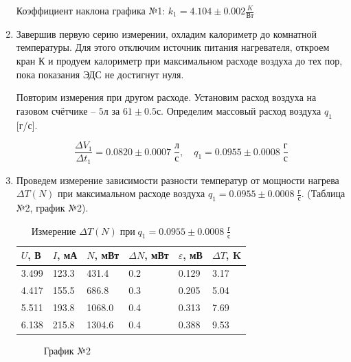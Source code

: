 \documentclass[a4paper,12pt]{article}
\begin{document}
\begin{enumerate}
		Коэффициент наклона графика №1: $k_1 = 4.104\pm0.002 \frac{K}{Вт}$
			
		\item Завершив первую серию измерении, охладим калориметр до комнатной температуры.
		Для этого отключим источник питания нагревателя, откроем кран К и продуем калориметр при максимальном расходе воздуха до тех пор, пока показания ЭДС не достигнут нуля.
		
		Повторим измерения при другом расходе. Установим расход воздуха на газовом счётчике -- $5$л за $61 \pm 0.5$с. Определим массовый расход воздуха $q_1$ [г/с].
		
		$$\frac{\Delta V_1}{\Delta t_1} = 0.0820 \pm 0.0007 \; \frac{л}{с} ,\quad  q_1 = 0.0955 \pm 0.0008 \; \frac{г}{с} $$
		
		\item Проведем измерение зависимости разности температур от мощности нагрева $\Delta T(N)$ при максимальном расходе воздуха $q_1 = 0.0955 \pm 0.0008 \; \frac{г}{с}$. (Таблица №2, график №2).
		
		\begin{table}[h!] 
			\caption{Измерение $\Delta T (N) \; {при} \; q_1 = 0.0955 \pm 0.0008 \; \frac{г}{с}$}
			\begin{center}
				\begin{tabular}{|*{6}{l|}}
					\hline
					$U$, В & $I$, мА & $N$, мВт & $\Delta N$, мВт &$\varepsilon$, мВ & $\Delta T$, K\\ \hline
					3.499 & 123.3 & 431.4 & 0.2 & 0.129 & 3.17 \\ \hline
					4.417 & 155.5 & 686.8 & 0.3 & 0.205 & 5.04 \\ \hline
					5.511 & 193.8 & 1068.0 & 0.4 & 0.313 & 7.69 \\ \hline
					6.138 & 215.8 & 1304.6 & 0.4 & 0.388 & 9.53 \\ \hline
				\end{tabular}
			\end{center}
		\end{table}

		\begin{figure}[h!]
			\caption[]{\label{fig:4} График №2}
		\end{figure}
	

\end{enumerate}
\end{document}
